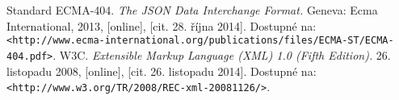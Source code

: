 \begin{thebibliography}{99}
 Standard ECMA-404. {\em The JSON Data Interchange Format.} Geneva: Ecma International, 2013, [online], [cit. 28. října 2014]. Dostupné na: {\tt <http://www.ecma-international.org/publications/files/ECMA-ST/ECMA-404.pdf>}.
 W3C. {\em Extensible Markup Language (XML) 1.0 (Fifth Edition).} 26. listopadu 2008, [online], [cit. 26. listopadu 2014]. Dostupné na: {\tt <http://www.w3.org/TR/2008/REC-xml-20081126/>}.
\end{thebibliography}
